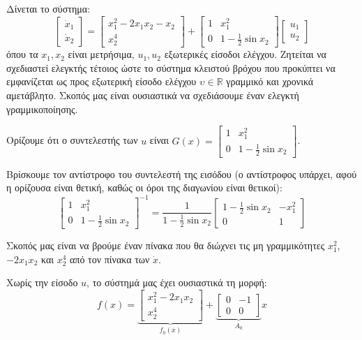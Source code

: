 \documentclass[11pt,a4paper,notitlepage,fleqn]{article}
\let\mytodo\todo
\renewcommand{\todo}[1]{\par\mytodo[inline,noline]{#1}}
\begin{document}
\begin{exercise}
	Δίνεται το σύστημα:
	\[
	\left[\begin{matrix}
	\dot x_1 \\ \dot x_2
	\end{matrix}\right] = \left[\begin{matrix}
	x_1^2 -2x_1x_2 -x_2 \\ x_2^4
	\end{matrix}\right] + \left[\begin{matrix}
	1 & x_1^2 \\ 0 & 1-\frac{1}{2}\sin x_2
	\end{matrix}\right]\left[\begin{matrix}
	u_1 \\ u_2
	\end{matrix}\right]
	\]
	όπου τα \( x_1,x_2 \) είναι μετρήσιμα, \( u_1,u_2 \) εξωτερικές
	είσοδοι ελέγχου. Ζητείται να σχεδιαστεί ελεγκτής τέτοιος ώστε το
	σύστημα κλειστού βρόχου που προκύπτει να εμφανίζεται ως προς εξωτερική
	είσοδο ελέγχου \( \upsilon \in \mathbb R \) γραμμικό και χρονικά
	αμετάβλητο.
	\tcblower
	Σκοπός μας είναι ουσιαστικά να σχεδιάσουμε έναν ελεγκτή γραμμικοποίησης.

	\todo{Graph 31}

	Ορίζουμε ότι ο συντελεστής των \( u \) είναι
	\( G(x) = 	\left[\begin{matrix}
	1 & x_1^2 \\ 0 & 1-\frac{1}{2}\sin x_2
	\end{matrix}\right] \).

	Βρίσκουμε τον αντίστροφο του συντελεστή της εισόδου (ο αντίστροφος
	υπάρχει, αφού η ορίζουσα είναι θετική, καθώς οι όροι της διαγωνίου
	είναι θετικοί):
	\[
	\left[\begin{matrix}
	1 & x_1^2 \\ 0 & 1-\frac{1}{2}\sin x_2
	\end{matrix}\right]^{-1} =
	\frac{1}{1-\frac{1}{2}\sin x_2}\left[\begin{matrix}
	1-\frac{1}{2}\sin x_2 & -x_1^2 \\ 0 & 1
	\end{matrix}\right]
	\]

	Σκοπός μας είναι να βρούμε έναν πίνακα που θα διώχνει τις
	μη γραμμικότητες \( x_1^2 \), \( -2x_1x_2 \) και \( x_2^4 \) από
	τον πίνακα των \( \dot x \).

	Χωρίς την είσοδο \( u \), το σύστημά μας έχει ουσιαστικά τη μορφή:
	\[
	f(x) = \underbrace{\left[
	\begin{matrix}
	x_1^2 - 2x_1x_2 \\ x_2^4
	\end{matrix}
	\right]}_{f_0(x)}
    + \underbrace{\left[\begin{matrix}
    0 & -1 \\ 0 & 0
    \end{matrix}\right]}_{A_0}x
	\]


\end{exercise}
\end{document}
